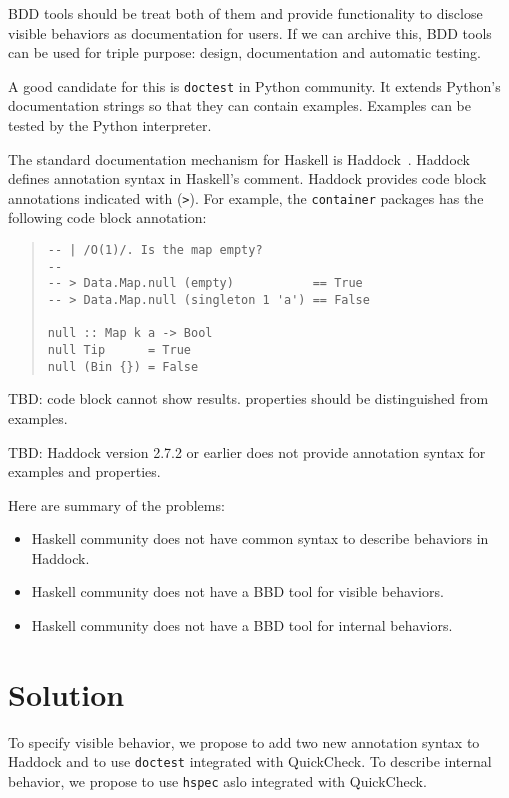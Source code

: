 \documentclass[preprint]{sigplanconf}
\begin{document}
BDD tools should be treat both of them and provide functionality
to disclose visible behaviors as documentation for users.
If we can archive this, BDD tools can be used for
triple purpose: design, documentation and automatic testing.

A good candidate for this is {\tt doctest} in Python community.
It extends Python's documentation strings so that they
can contain examples.
Examples can be tested by the Python interpreter.

The standard documentation mechanism for Haskell is
Haddock~\cite{haddock}.
Haddock defines annotation syntax in Haskell's comment.
Haddock provides code block annotations indicated with ({\tt >}).
For example, the {\tt container} packages has the following code block annotation:

\begin{quote}
\small
\begin{verbatim}
-- | /O(1)/. Is the map empty?
--
-- > Data.Map.null (empty)           == True
-- > Data.Map.null (singleton 1 'a') == False

null :: Map k a -> Bool
null Tip      = True
null (Bin {}) = False
\end{verbatim}
\end{quote}

TBD: code block cannot show results. properties should be distinguished from examples.

TBD: Haddock version 2.7.2 or earlier does not provide annotation syntax
for examples and properties.

Here are summary of the problems:

\begin{itemize}
\item Haskell community does not have common syntax to describe
behaviors in Haddock.
\item Haskell community does not have a BBD tool for visible behaviors.
\item Haskell community does not have a BBD tool for internal behaviors.
\end{itemize}

\section{Solution}

To specify visible behavior, we propose to add two new annotation syntax to Haddock and to use {\tt doctest} integrated with QuickCheck. To describe internal behavior, we propose to use {\tt hspec} aslo integrated with QuickCheck.
\end{document}
